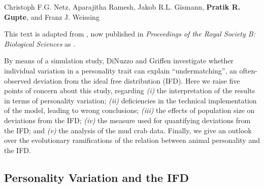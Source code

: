 
\pagestyle{plain}

\begingroup

\let\clearpage\relax
\let\cleardoublepage\relax
\let\cleardoublepage\relax

\begin{interludeenv}

\renewcommand\thefigure{\theinterludes-\arabic{figure}}
\setcounter{figure}{0}
\setcounter{footnote}{0}


\label{box:details}

	\noindent Christoph F.G. Netz, Aparajitha Ramesh, Jakob R.L. Gismann, \textbf{Pratik R. Gupte}, and Franz J. Weissing

	\medskip

	\noindent {\large{$\Delta$}} {\footnotesize This text is adapted from \citet{netz2022}, now published in \textit{Proceedings of the Royal Society B: Biological Sciences} as .}

	\medskip
	\footnotesize

	By means of a simulation study, DiNuzzo and Griffen  investigate whether individual variation in a personality trait can explain ``undermatching'', an often-observed deviation from the ideal free distribution (IFD). 
	Here we raise five points of concern about this study, regarding \emph{(i)} the interpretation of the results in terms of personality variation; \emph{(ii)} deficiencies in the technical implementation of the model, leading to wrong conclusions; \emph{(iii)} the effects of population size on deviations from the IFD; \emph{(iv)} the measure used for quantifying deviations from the IFD; and \emph{(v)} the analysis of the mud crab data. 
	Finally, we give an outlook over the evolutionary ramifications of the relation between animal personality and the IFD.
	
	\subsection*{Personality Variation and the IFD}
	

\end{interludeenv}
